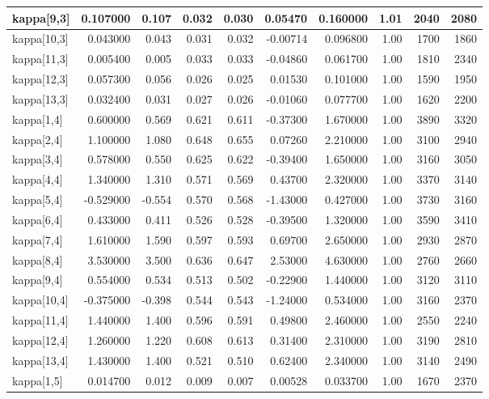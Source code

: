 \documentclass[
]{article}
\begin{document}
\begin{longtable*}[t]{l|r|r|r|r|r|r|r|r|r}
\hline
kappa[9,3] & 0.107000 & 0.107 & 0.032 & 0.030 & 0.05470 & 0.160000 & 1.01 & 2040 & 2080\\
\hline
kappa[10,3] & 0.043000 & 0.043 & 0.031 & 0.032 & -0.00714 & 0.096800 & 1.00 & 1700 & 1860\\
\hline
kappa[11,3] & 0.005400 & 0.005 & 0.033 & 0.033 & -0.04860 & 0.061700 & 1.00 & 1810 & 2340\\
\hline
kappa[12,3] & 0.057300 & 0.056 & 0.026 & 0.025 & 0.01530 & 0.101000 & 1.00 & 1590 & 1950\\
\hline
kappa[13,3] & 0.032400 & 0.031 & 0.027 & 0.026 & -0.01060 & 0.077700 & 1.00 & 1620 & 2200\\
\hline
kappa[1,4] & 0.600000 & 0.569 & 0.621 & 0.611 & -0.37300 & 1.670000 & 1.00 & 3890 & 3320\\
\hline
kappa[2,4] & 1.100000 & 1.080 & 0.648 & 0.655 & 0.07260 & 2.210000 & 1.00 & 3100 & 2940\\
\hline
kappa[3,4] & 0.578000 & 0.550 & 0.625 & 0.622 & -0.39400 & 1.650000 & 1.00 & 3160 & 3050\\
\hline
kappa[4,4] & 1.340000 & 1.310 & 0.571 & 0.569 & 0.43700 & 2.320000 & 1.00 & 3370 & 3140\\
\hline
kappa[5,4] & -0.529000 & -0.554 & 0.570 & 0.568 & -1.43000 & 0.427000 & 1.00 & 3730 & 3160\\
\hline
kappa[6,4] & 0.433000 & 0.411 & 0.526 & 0.528 & -0.39500 & 1.320000 & 1.00 & 3590 & 3410\\
\hline
kappa[7,4] & 1.610000 & 1.590 & 0.597 & 0.593 & 0.69700 & 2.650000 & 1.00 & 2930 & 2870\\
\hline
kappa[8,4] & 3.530000 & 3.500 & 0.636 & 0.647 & 2.53000 & 4.630000 & 1.00 & 2760 & 2660\\
\hline
kappa[9,4] & 0.554000 & 0.534 & 0.513 & 0.502 & -0.22900 & 1.440000 & 1.00 & 3120 & 3110\\
\hline
kappa[10,4] & -0.375000 & -0.398 & 0.544 & 0.543 & -1.24000 & 0.534000 & 1.00 & 3160 & 2370\\
\hline
kappa[11,4] & 1.440000 & 1.400 & 0.596 & 0.591 & 0.49800 & 2.460000 & 1.00 & 2550 & 2240\\
\hline
kappa[12,4] & 1.260000 & 1.220 & 0.608 & 0.613 & 0.31400 & 2.310000 & 1.00 & 3190 & 2810\\
\hline
kappa[13,4] & 1.430000 & 1.400 & 0.521 & 0.510 & 0.62400 & 2.340000 & 1.00 & 3140 & 2490\\
\hline
kappa[1,5] & 0.014700 & 0.012 & 0.009 & 0.007 & 0.00528 & 0.033700 & 1.00 & 1670 & 2370\\

\end{longtable*}
\end{document}
